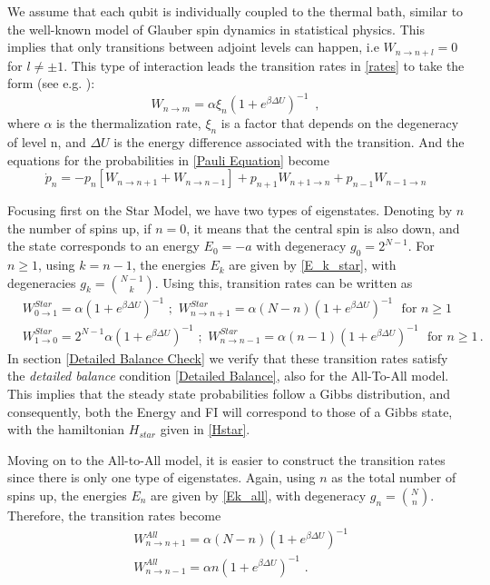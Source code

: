 We assume that each qubit is individually coupled to the thermal bath, similar to the well-known model of Glauber spin dynamics in statistical physics. This implies that only transitions between adjoint levels can happen, i.e $W_{n\to n+l}=0$ for $l\neq \pm1$. This type of interaction leads the transition rates in \eqref{rates} to take the form (see e.g. \cite{puig2024dynamical}):
\begin{equation}
W_{n \to m} = \alpha \xi_n\left(1 + e^{\beta \Delta U}\right)^{-1} \, \, \, ,
\end{equation}
where $\alpha$ is the thermalization rate, $\xi_n$ is a factor that depends on the degeneracy of level n, and $\Delta U$ is the energy difference associated with the transition. And the equations for the probabilities in \eqref{Pauli Equation} become
\begin{equation}\label{Probabilities General}
    \dot p_n=-p_n[W_{n\to n+1}+W_{n\to n-1}] +p_{n+1}W_{n+1\to n} + p_{n-1}W_{n-1\to n}
\end{equation}

Focusing first on the Star Model, we have two types of eigenstates. Denoting by $n$ the number of spins up, if $n=0$, it means that the central spin is also down, and the state corresponds to an energy $E_0=-a$ with degeneracy $g_0=2^{N-1}$. For $n\geq1$, using $k=n-1$, the energies $E_k$ are given by \eqref{E_k_star}, with degeneracies $g_k=\binom{N-1}{k}$. Using this, transition rates can be written as
\begin{align}\label{Transition rates Star}
    &W_{0\to 1}^{Star}=\alpha\left(1 + e^{\beta \Delta U}\right)^{-1}\,\,;\,\, W_{n\to n+1}^{Star} = \alpha(N-n)\left(1 + e^{\beta \Delta U}\right)^{-1}\,\,\,\, \text{for }n\geq1\\
    &W_{1\to 0}^{Star}=2^{N-1}\alpha\left(1 + e^{\beta \Delta U}\right)^{-1}\,\,;\,\, W_{n\to n-1}^{Star} = \alpha(n-1)\left(1 + e^{\beta \Delta U}\right)^{-1}\,\,\,\, \text{for }n\geq1\,.
\end{align}
In section \ref{Detailed Balance Check} we verify that these transition rates satisfy the \textit{detailed balance} condition \eqref{Detailed Balance}, also for the All-To-All model. This implies that the steady state probabilities follow a Gibbs distribution, and consequently, both the Energy and FI will correspond to those of a Gibbs state, with the hamiltonian $H_{star}$ given in \eqref{Hstar}.

Moving on to the All-to-All model, it is easier to construct the transition rates since there is only one type of eigenstates. Again, using $n$ as the total number of spins up, the energies $E_n$ are given by \eqref{Ek_all}, with degeneracy $g_n=\binom{N}{n}$. Therefore, the transition rates become
\begin{align}\label{Transition rates All - 1}
    &W_{n\to n+1}^{All} = \alpha(N-n)\left(1 + e^{\beta \Delta U}\right)^{-1}\\\label{Transition rates All - 2}
    &W_{n\to n-1}^{All} = \alpha n\left(1 + e^{\beta \Delta U}\right)^{-1}\,\,.
\end{align}

